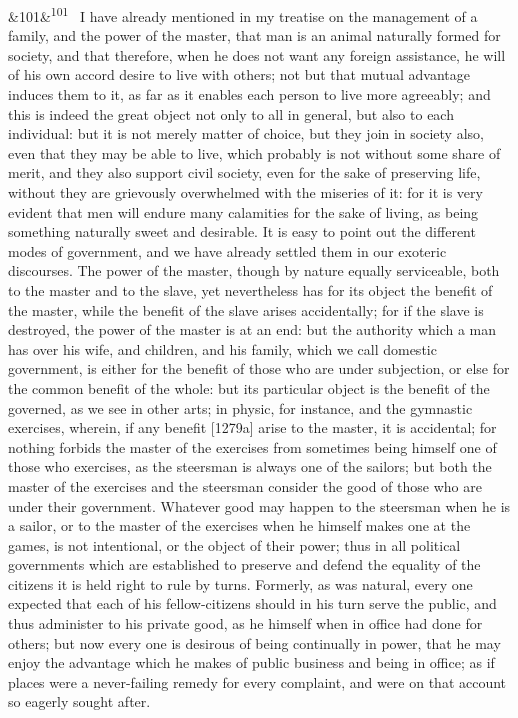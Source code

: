 \documentclass[12pt]{article}
\newcommand{\para}[1][]{\par\noindent\ifx&#1&\else\textsuperscript{\footnotesize #1}~\fi}
\begin{document}
\para[101] I have already mentioned in my treatise on the management of a family, and the power of the master, that man is an animal naturally formed for society, and that therefore, when he does not want any foreign assistance, he will of his own accord desire to live with others; not but that mutual advantage induces them to it, as far as it enables each person to live more agreeably; and this is indeed the great object not only to all in general, but also to each individual: but it is not merely matter of choice, but they join in society also, even that they may be able to live, which probably is not without some share of merit, and they also support civil society, even for the sake of preserving life, without they are grievously overwhelmed with the miseries of it: for it is very evident that men will endure many calamities for the sake of living, as being something naturally sweet and desirable. It is easy to point out the different modes of government, and we have already settled them in our exoteric discourses. The power of the master, though by nature equally serviceable, both to the master and to the slave, yet nevertheless has for its object the benefit of the master, while the benefit of the slave arises accidentally; for if the slave is destroyed, the power of the master is at an end: but the authority which a man has over his wife, and children, and his family, which we call domestic government, is either for the benefit of those who are under subjection, or else for the common benefit of the whole: but its particular object is the benefit of the governed, as we see in other arts; in physic, for instance, and the gymnastic exercises, wherein, if any benefit [1279a] arise to the master, it is accidental; for nothing forbids the master of the exercises from sometimes being himself one of those who exercises, as the steersman is always one of the sailors; but both the master of the exercises and the steersman consider the good of those who are under their government. Whatever good may happen to the steersman when he is a sailor, or to the master of the exercises when he himself makes one at the games, is not intentional, or the object of their power; thus in all political governments which are established to preserve and defend the equality of the citizens it is held right to rule by turns. Formerly, as was natural, every one expected that each of his fellow-citizens should in his turn serve the public, and thus administer to his private good, as he himself when in office had done for others; but now every one is desirous of being continually in power, that he may enjoy the advantage which he makes of public business and being in office; as if places were a never-failing remedy for every complaint, and were on that account so eagerly sought after.
\end{document}
